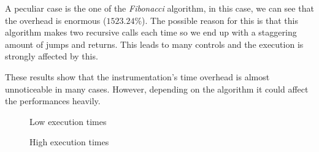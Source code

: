 A peculiar case is the one of the \textit{Fibonacci} algorithm, in this case, we
can see that the overhead is enormous ($1523.24\%$). The possible reason for this
is that this algorithm makes two recursive calls each time so we end up with a staggering
amount of jumps and returns. This leads to many controls and the execution is
strongly affected by this.

These results show that the instrumentation's time overhead is almost
unnoticeable in many cases. However, depending on the algorithm it could affect
the performances heavily.

\begin{figure}[htbp]
  \centering
  \def\stackalignment{r} %
  {\scriptsize }
  \caption{Low execution times}
  \label{fig:lowtime}
\end{figure}

\begin{figure}[htbp]
  \centering
  \def\stackalignment{r} %
  {\scriptsize }
  \caption{High execution times}
  \label{fig:hightime}
\end{figure}

